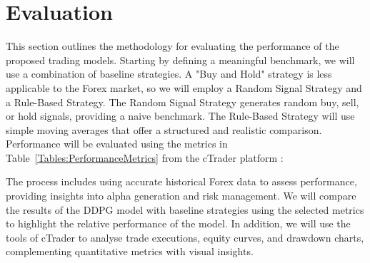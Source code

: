 \section{Evaluation}

This section outlines the methodology for evaluating the performance of the proposed trading models. Starting by defining a meaningful benchmark, we will use a combination of baseline strategies. A "Buy and Hold" strategy is less applicable to the Forex market, so we will employ a Random Signal Strategy and a Rule-Based Strategy. The Random Signal Strategy generates random buy, sell, or hold signals, providing a naive benchmark. The Rule-Based Strategy will use simple moving averages that offer a structured and realistic comparison. Performance will be evaluated using the metrics in Table~\ref{Tables:PerformanceMetrics} from the cTrader platform :



The process includes using accurate historical Forex data to assess performance, providing insights into alpha generation and risk management. We will compare the results of the DDPG model with baseline strategies using the selected metrics to highlight the relative performance of the model. In addition, we will use the tools of cTrader to analyse trade executions, equity curves, and drawdown charts, complementing quantitative metrics with visual insights.
